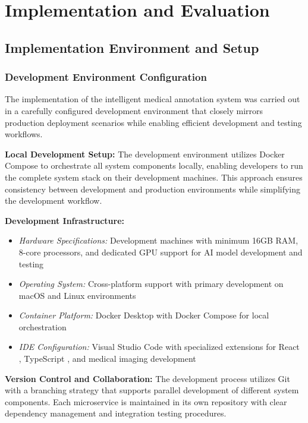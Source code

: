 \chapter{Implementation and Evaluation}

\section{Implementation Environment and Setup}

\subsection{Development Environment Configuration}

The implementation of the intelligent medical annotation system was carried out in a carefully configured development environment that closely mirrors production deployment scenarios while enabling efficient development and testing workflows.

\textbf{Local Development Setup:} The development environment utilizes Docker Compose to orchestrate all system components locally, enabling developers to run the complete system stack on their development machines. This approach ensures consistency between development and production environments while simplifying the development workflow.

\textbf{Development Infrastructure:}
\begin{itemize}
    \item \textit{Hardware Specifications:} Development machines with minimum 16GB RAM, 8-core processors, and dedicated GPU support for AI model development and testing
    \item \textit{Operating System:} Cross-platform support with primary development on macOS and Linux environments
    \item \textit{Container Platform:} Docker Desktop with Docker Compose for local orchestration
    \item \textit{IDE Configuration:} Visual Studio Code with specialized extensions for React \cite{react2023}, TypeScript \cite{typescript2023}, and medical imaging development
\end{itemize}

\textbf{Version Control and Collaboration:} The development process utilizes Git with a branching strategy that supports parallel development of different system components. Each microservice is maintained in its own repository with clear dependency management and integration testing procedures.

